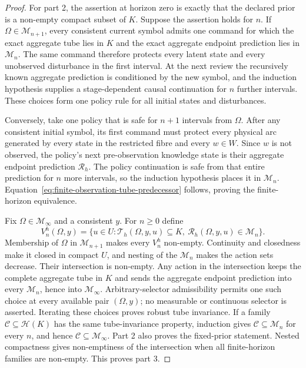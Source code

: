 \documentclass[11pt]{article}
\theoremstyle{definition}
\begin{document}
\begin{proof}
For part 2, the assertion at horizon zero is exactly that the declared prior
is a non-empty compact subset of $K$.  Suppose the assertion holds for $n$.
If $\Omega\in\mathcal M_{n+1}$, every consistent current symbol admits one
command for which the exact aggregate tube lies in $K$ and the exact
aggregate endpoint prediction lies in $\mathcal M_n$.  The same command
therefore protects every latent state and every unobserved disturbance in
the first interval.  At the next review the recursively known aggregate
prediction is conditioned by the new symbol, and the induction hypothesis
supplies a stage-dependent causal continuation for $n$ further intervals.
These choices form one policy rule for all initial states and disturbances.

Conversely, take one policy that is safe for $n+1$ intervals from $\Omega$.
After any consistent initial symbol, its first command must protect every
physical arc generated by every state in the restricted fibre and every
$w\in W$.  Since $w$ is not observed, the policy's next pre-observation
knowledge state is their aggregate endpoint prediction $\mathscr R_h$.
The policy continuation is safe from that entire prediction for $n$ more
intervals, so the induction hypothesis places it in $\mathcal M_n$.
Equation~\eqref{eq:finite-observation-tube-predecessor} follows, proving the
finite-horizon equivalence.

Fix $\Omega\in\mathcal M_\infty$ and a consistent $y$.  For $n\ge0$ define
\[
V_n^h(\Omega,y)=\{u\in U:
\mathscr T_h(\Omega,y,u)\subseteq K,
\ \mathscr R_h(\Omega,y,u)\in\mathcal M_n\}.
\]
Membership of $\Omega$ in $\mathcal M_{n+1}$ makes every $V_n^h$ non-empty.
Continuity and closedness make it closed in compact $U$, and nesting of the
$\mathcal M_n$ makes the action sets decrease.  Their intersection is
non-empty.  Any action in the intersection keeps the complete aggregate
tube in $K$ and sends the aggregate endpoint prediction into every
$\mathcal M_n$, hence into $\mathcal M_\infty$.  Arbitrary-selector
admissibility permits one such choice at every available pair $(\Omega,y)$;
no measurable or continuous selector is asserted.  Iterating these choices
proves robust tube invariance.  If a family $\mathcal C\subseteq\mathcal H(K)$
has the same tube-invariance property, induction gives
$\mathcal C\subseteq\mathcal M_n$ for every $n$, and hence
$\mathcal C\subseteq\mathcal M_\infty$.  Part 2 also proves the fixed-prior
statement.  Nested compactness gives non-emptiness of the intersection when
all finite-horizon families are non-empty.  This proves part 3.


\end{proof}
\end{document}
